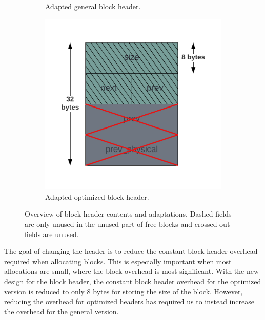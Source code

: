 \begin{figure}[H]
\begin{subfigure}[b]{0.3\textwidth}
        \caption{Adapted general block header.}
        \label{fig:blockheader_adap_general}
    \end{subfigure}%
    \hfill
    \begin{subfigure}[b]{0.3\textwidth}
        \centering
        \includegraphics[width=\textwidth]{figures/blockheader_adap_optimized.png}
        \caption{Adapted optimized block header.}
        \label{fig:blockheader_adap_optimized}
    \end{subfigure}
    \caption{Overview of block header contents and adaptations. Dashed fields are only unused in the unused part of free blocks and crossed out fields are unused.}
    \label{fig:blockheader_adaptations}
\end{figure}

The goal of changing the header is to reduce the constant block header overhead required when allocating blocks. This is especially important when most allocations are small, where the block overhead is most significant. With the new design for the block header, the constant block header overhead for the optimized version is reduced to only 8 bytes for storing the size of the block. However, reducing the overhead for optimized headers has required us to instead increase the overhead for the general version.


